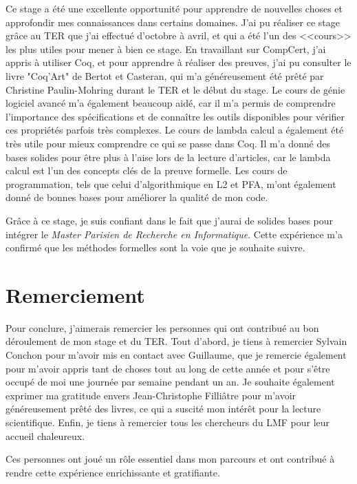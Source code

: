 \documentclass{article}
\begin{document}
  Ce stage a été une excellente opportunité pour apprendre de nouvelles choses
et approfondir mes connaissances dans certains domaines. J'ai pu réaliser ce
stage grâce au TER que j'ai effectué d'octobre à avril, et qui a été l'un des
<<cours>> les plus utiles pour mener à bien ce stage. En travaillant sur
CompCert, j'ai appris à utiliser Coq, et pour apprendre à réaliser des preuves,
j'ai pu consulter le livre "Coq'Art" de Bertot et Casteran\cite{bertot2015coq},
qui m'a généreusement été prêté par Christine Paulin-Mohring durant le TER et le
début du stage. Le cours de génie logiciel avancé m'a également beaucoup aidé,
car il m'a permis de comprendre l'importance des spécifications et de connaître
les outils disponibles pour vérifier ces propriétés parfois très complexes. Le
cours de lambda calcul a également été très utile pour mieux comprendre ce qui
se passe dans Coq. Il m'a donné des bases solides pour être plus à l'aise lors
de la lecture d'articles, car le lambda calcul est l'un des concepts clés de la
preuve formelle. Les cours de programmation, tels que celui d'algorithmique en
L2 et PFA, m'ont également donné de bonnes bases pour améliorer la qualité de
mon code.

Grâce à ce stage, je suis confiant dans le fait que j'aurai de solides bases
pour intégrer le \textit{Master Parisien de Recherche en Informatique}. Cette
expérience m'a confirmé que les méthodes formelles sont la voie que
je souhaite suivre.

  \section{Remerciement}

  Pour conclure, j'aimerais remercier les personnes qui ont contribué au bon
déroulement de mon stage et du TER. Tout d'abord, je tiens à remercier Sylvain
Conchon pour m'avoir mis en contact avec Guillaume, que je remercie également
pour m'avoir appris tant de choses tout au long de cette année et pour s'être
occupé de moi une journée par semaine pendant un an. Je souhaite également
exprimer ma gratitude envers Jean-Christophe Filliâtre pour m'avoir
généreusement prêté des livres, ce qui a suscité mon intérêt pour la lecture
scientifique. Enfin, je tiens à remercier tous les chercheurs du LMF pour leur
accueil chaleureux.

  Ces personnes ont joué un rôle essentiel dans mon parcours et ont contribué à
rendre cette expérience enrichissante et gratifiante.

  
  
\end{document}
